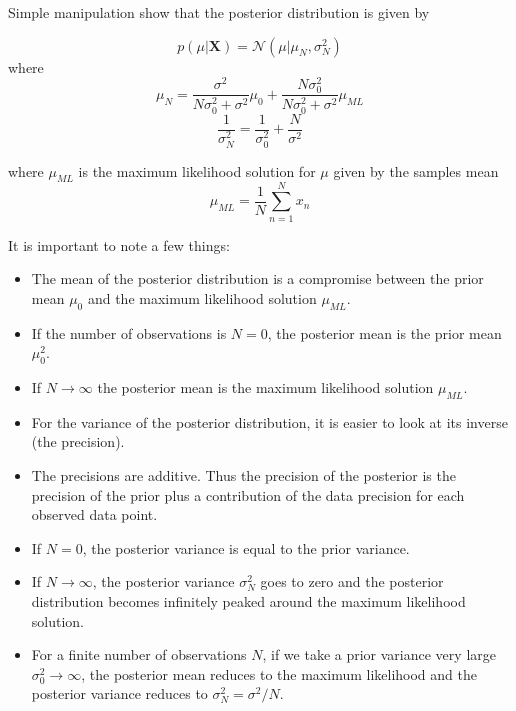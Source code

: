 Simple manipulation show that the posterior distribution is given by

\begin{equation}
    p(\mu | \boldsymbol{X}) = \mathcal{N}(\mu | \mu_N, \sigma_N^2)
\end{equation}
where
\begin{equation}
    \mu_N = \frac{\sigma^2}{N\sigma_0^2 + \sigma^2} \mu_0 + \frac{N\sigma_0^2}{N\sigma_0^2 + \sigma^2}\mu_{ML}
\end{equation}
\begin{equation}
    \frac{1}{\sigma_N^2} = \frac{1}{\sigma_0^2} + \frac{N}{\sigma^2}
\end{equation}

where $\mu_{ML}$ is the maximum likelihood solution for $\mu$ given by the samples mean
\begin{equation}
    \mu_{ML} = \frac{1}{N}\sum_{n=1}^{N} x_n
\end{equation}

It is important to note a few things:
\begin{itemize}
    \item The mean of the posterior distribution is a compromise between the prior mean $\mu_0$ and the maximum likelihood solution $\mu_{ML}$.
    \item If the number of observations is $N = 0$, the posterior mean is the prior mean $\mu_0^2$.
    \item If $N \rightarrow \infty$ the posterior mean is the maximum likelihood solution $\mu_{ML}$.
    \item For the variance of the posterior distribution, it is easier to look at its inverse (the precision).
    \item The precisions are additive. Thus the precision of the posterior is the precision of the prior plus a contribution of the data precision for each observed data point.
    \item If $N = 0$, the posterior variance is equal to the prior variance.
    \item If $N \rightarrow \infty$, the posterior variance $\sigma_N^2$ goes to zero and the posterior distribution becomes infinitely peaked around the maximum likelihood solution.
    \item For a finite number of observations $N$, if we take a prior variance very large $\sigma_0^2 \rightarrow \infty$, the posterior mean reduces to the maximum likelihood and the posterior variance reduces to $\sigma_N^2 = \sigma^2/N$.
\end{itemize}

